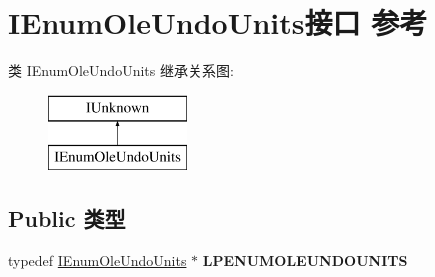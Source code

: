 \hypertarget{interface_i_enum_ole_undo_units}{}\section{I\+Enum\+Ole\+Undo\+Units接口 参考}
\label{interface_i_enum_ole_undo_units}
类 I\+Enum\+Ole\+Undo\+Units 继承关系图\+:\begin{figure}[H]
\begin{center}
\leavevmode
\includegraphics[height=2.000000cm]{interface_i_enum_ole_undo_units}
\end{center}
\end{figure}
\subsection*{Public 类型}
\begin{DoxyCompactItemize}
\item 
\mbox{\label{interface_i_enum_ole_undo_units_a9fe7fa025997ef2ecf38a371c7af5e11}} 
typedef \hyperlink{interface_i_enum_ole_undo_units}{I\+Enum\+Ole\+Undo\+Units} $\ast$ {\bfseries L\+P\+E\+N\+U\+M\+O\+L\+E\+U\+N\+D\+O\+U\+N\+I\+TS}
\end{DoxyCompactItemize}
